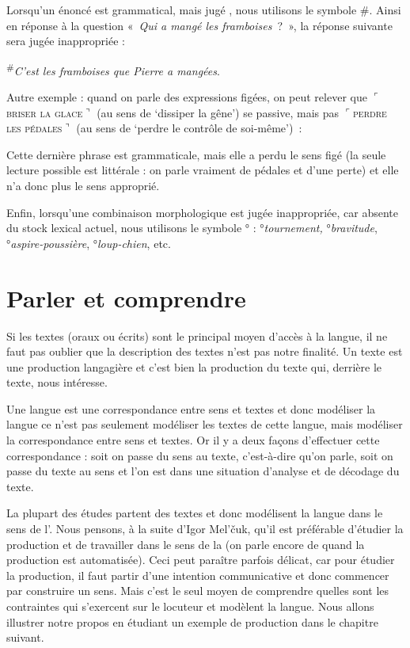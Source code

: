 Lorsqu’un énoncé est grammatical, mais jugé , nous utilisons le symbole \#. Ainsi en réponse à la question «~\textit{Qui a mangé les framboises~}?~», la réponse suivante sera jugée inappropriée :

\ea
\textsuperscript{\#}{\itshape C’est les framboises que Pierre a mangées}.
\z

Autre exemple : quand on parle des expressions figées, on peut relever que $⌜$\textsc{briser} \textsc{la} \textsc{glace}$⌝$ (au sens de ‘dissiper la gêne’) se passive, mais pas $⌜$\textsc{perdre} \textsc{les} \textsc{pédales}$⌝$ (au sens de ‘perdre le contrôle de soi-même’)~:

\ea
\z
\z

Cette dernière phrase est grammaticale, mais elle a perdu le sens figé (la seule lecture possible est littérale : on parle vraiment de pédales et d’une perte) et elle n’a donc plus le sens approprié.

Enfin, lorsqu’une combinaison morphologique est jugée inappropriée, car absente du stock lexical actuel, nous utilisons le symbole ° : °\textit{tournement,} °\textit{bravitude}, °\textit{aspire-poussière}, °\textit{loup-chien}, etc.

\section{Parler et comprendre}\label{sec:1.1.12}

Si les textes (oraux ou écrits) sont le principal moyen d’accès à la langue, il ne faut pas oublier que la description des textes n’est pas notre finalité. Un texte est une production langagière et c’est bien la production du texte qui, derrière le texte, nous intéresse.

Une langue est une correspondance entre sens et textes et donc modéliser la langue ce n’est pas seulement modéliser les textes de cette langue, mais modéliser la correspondance entre sens et textes. Or il y a deux façons d’effectuer cette correspondance : soit on passe du sens au texte, c’est-à-dire qu’on parle, soit on passe du texte au sens et l’on est dans une situation d’analyse et de décodage du texte.

La plupart des études partent des textes et donc modélisent la langue dans le sens de l’. Nous pensons, à la suite d’Igor Mel’čuk, qu’il est préférable d’étudier la production et de travailler dans le sens de la  (on parle encore de  quand la production est automatisée). Ceci peut paraître parfois délicat, car pour étudier la production, il faut partir d’une intention communicative et donc commencer par construire un sens. Mais c’est le seul moyen de comprendre quelles sont les contraintes qui s’exercent sur le locuteur et modèlent la langue. Nous allons illustrer notre propos en étudiant un exemple de production dans le chapitre suivant.

